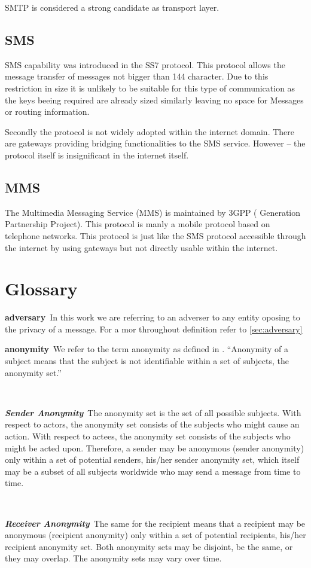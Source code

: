 \documentclass[a4paper,appendixprefix,pdfusetitle,twocolumn,fontsize=8pt,attachdocs,draft,status=draft]{scrbook}
\newenvironment{entry}{\par\leavevmode\hangpara{1.5mm}{1}\ignorespaces}{\RaggedRight\par}
\newcommand*{\mainentry}[2]{{\bfseries{#1\label{def:#1}}}~#2\par}
\newcommand*{\subentry}[2]{\par~\begin{minipage}{\columnwidth-0.6cm}{\bfseries{\itshape{#1\label{def:#1}}}}~#2\end{minipage}}
\begin{document}
SMTP is considered a strong candidate as transport layer.  

\section{SMS}
SMS capability was introduced in the SS7 protocol. This protocol allows the message transfer of messages not bigger than 144 character. Due to this restriction in size it is unlikely to be suitable for this type of communication as the keys beeing required are already sized similarly leaving no space for Messages or routing information.

Secondly the protocol is not widely adopted within the internet domain. There are gateways providing bridging functionalities to the SMS service. However -- the protocol itself is insignificant in the internet itself. 

\section{MMS}
The Multimedia Messaging Service (MMS) is maintained by 3GPP ( Generation Partnership Project). This protocol is manly a mobile protocol based on telephone networks. This protocol is just like the SMS protocol accessible through the internet by using gateways but not directly usable within the internet.

\chapter{Glossary}

\begin{entry}
  \mainentry{adversary}{In this work we are referring to an adverser to any entity oposing to the privacy of a message. For a mor throughout definition refer to \ref{sec:adversary}}
\end{entry}

\begin{entry}
	\mainentry{anonymity}{We refer to the term anonymity as defined in \cite{anon_terminology}. ``Anonymity of a subject means that the subject is not identifiable within a set of subjects, the anonymity set.''\omitted}
	\subentry{Sender Anonymity}{The anonymity set is the set of all possible subjects. With respect to actors, the 	anonymity set consists of the subjects who might cause an action. With respect to actees, the anonymity set consists of the subjects who might be acted upon. Therefore, a sender may be anonymous (sender anonymity) only within a set of potential senders, his/her sender anonymity set, which itself may be a subset of all subjects worldwide who may send a message from time to time.}
	\subentry{Receiver Anonymity}{The same for the recipient means that a recipient may be anonymous (recipient anonymity) only within a set of potential recipients, his/her recipient anonymity set. Both anonymity sets may be disjoint, be the same, or they may overlap. The anonymity sets may vary over time.}
\end{entry}
\end{document}
